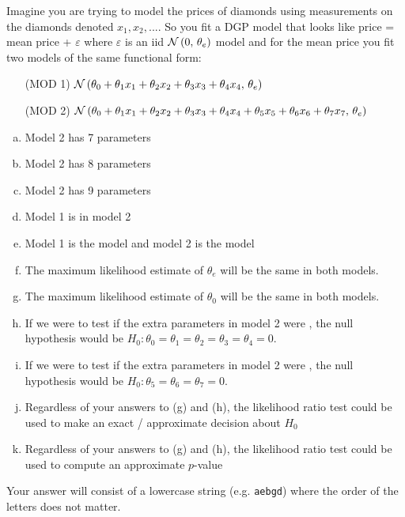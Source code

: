 \documentclass[12pt,landscape]{article}
\newcommand{\instr}{\small Your answer will consist of a lowercase string (e.g. \texttt{aebgd}) where the order of the letters does not matter. \normalsize}
\begin{document}


\problem{} Imagine you are trying to model the prices of diamonds using measurements on the diamonds denoted $x_1, x_2, ...$. So you fit a DGP model that looks like price = mean price + $\varepsilon$ where $\varepsilon$ is an iid $\mathcal{N}\left(0,\,\theta_e\right)$ model and for the mean price you fit two models of the same functional form:

\begin{itemize}
\item[(MOD 1)] $\mathcal{N}\left(\theta_0 + \theta_1 x_1 + \theta_2 x_2 + \theta_3 x_3 + \theta_4  x_4,\,\theta_e\right)$
\item[(MOD 2)] $\mathcal{N}\left(\theta_0 + \theta_1 x_1 + \theta_2 x_2 + \theta_3 x_3 + \theta_4  x_4 + \theta_5 x_5 + \theta_6 x_6 + \theta_7 x_7,\,\theta_e\right)$
\end{itemize}


\vspace{-0.2cm}\benum{} 

\begin{enumerate}[(a)]
\item Model 2 has 7 parameters
\item Model 2 has 8 parameters
\item Model 2 has 9 parameters
\item Model 1 is  in model 2
\item Model 1 is the  model and model 2 is the  model
\item The maximum likelihood estimate of $\theta_e$ will be the same in both models.
\item The maximum likelihood estimate of $\theta_0$ will be the same in both models.
\item If we were to test if the extra parameters in model 2 were , the null hypothesis would be $H_0: \theta_0 = \theta_1 = \theta_2 = \theta_3 = \theta_4 = 0$.
\item If we were to test if the extra parameters in model 2 were , the null hypothesis would be $H_0: \theta_5 = \theta_6 = \theta_7 = 0$.
\item Regardless of your answers to (g) and (h), the likelihood ratio test could be used to make an exact / approximate decision about $H_0$
\item Regardless of your answers to (g) and (h), the likelihood ratio test could be used to compute an approximate $p$-value
\end{enumerate}
\eenum\instr\pagebreak
\end{document}
